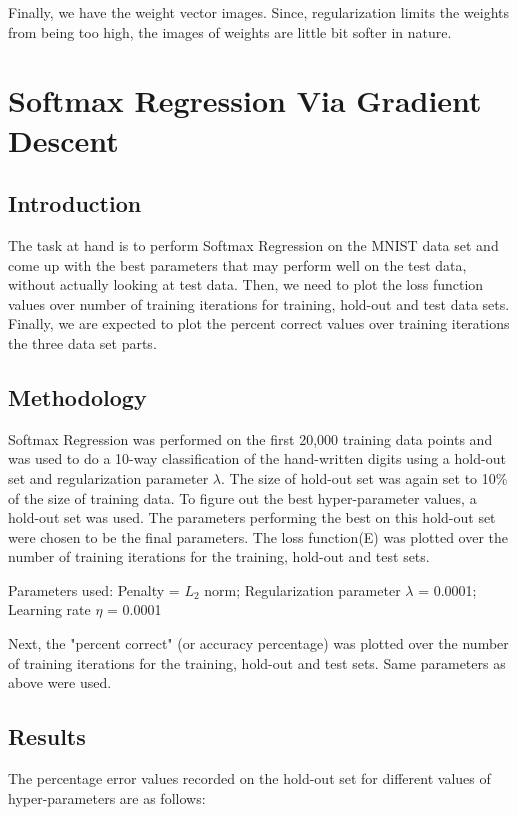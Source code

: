 \documentclass{article}
\begin{document}
Finally, we have the weight vector images. Since, regularization limits the weights from being too high, the images of weights are little bit softer in nature.

\newpage
\section{Softmax Regression Via Gradient Descent}

\subsection{Introduction}
The task at hand is to perform Softmax Regression on the MNIST data set and come up with the best parameters that may perform well on the test data, without actually looking at test data. Then, we need to plot the loss function values over number of training iterations for training, hold-out and test data sets. Finally, we are expected to plot the percent correct values over training iterations the three data set parts. 

\subsection{Methodology}
Softmax Regression was performed on the first 20,000 training data points and was used to do a 10-way classification of the hand-written digits using a hold-out set and regularization parameter $\lambda$. The size of hold-out set was again set to 10\% of the size of training data. To figure out the best hyper-parameter values, a hold-out set was used. The parameters performing the best on this hold-out set were chosen to be the final parameters. The loss function(E) was plotted over the number of training iterations for the training, hold-out and test sets. 

Parameters used:
Penalty = $L_{2}$ norm;
Regularization parameter $\lambda$ = 0.0001;
Learning rate $\eta$ = 0.0001

Next, the "percent correct" (or accuracy percentage) was plotted over the number of training iterations for the training, hold-out and test sets. Same parameters as above were used.

\subsection{Results}
The percentage error values recorded on the hold-out set for different values of hyper-parameters are as follows:
\end{document}
